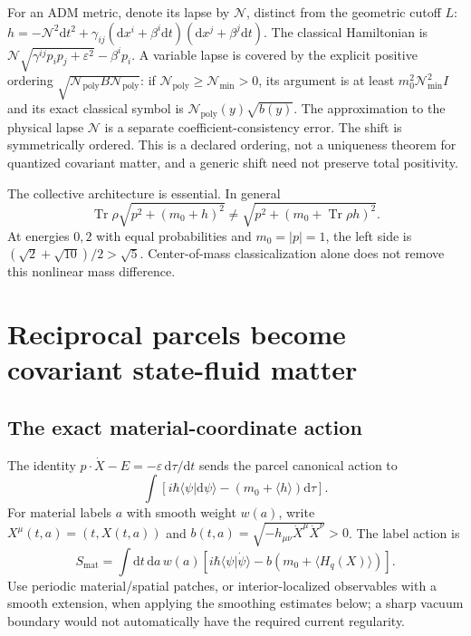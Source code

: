 \documentclass[11pt]{article}
\newcommand{\Tr}{\operatorname{Tr}}\newcommand{\dd}{\mathrm d}
\begin{document}
For an ADM metric, denote its lapse by $\mathcal N$, distinct from the geometric cutoff $L$:
$h=-\mathcal N^2\dd t^2+\gamma_{ij}(\dd x^i+\beta^i\dd t)(\dd x^j+\beta^j\dd t)$.
The classical Hamiltonian is
$\mathcal N\sqrt{\gamma^{ij}p_ip_j+\varepsilon^2}-\beta^ip_i$.
A variable lapse is covered by the explicit positive ordering
$\sqrt{\mathcal N_{\mathrm{poly}}B\mathcal N_{\mathrm{poly}}}$:
if $\mathcal N_{\mathrm{poly}}\ge\mathcal N_{\min}>0$, its argument is at least
$m_0^2\mathcal N_{\min}^2I$ and its exact classical symbol is
$\mathcal N_{\mathrm{poly}}(y)\sqrt{b(y)}$.
The approximation to the physical lapse $\mathcal N$ is a separate coefficient-consistency error.
The shift is symmetrically ordered. This is a declared ordering, not a uniqueness theorem for quantized covariant matter, and a generic shift need not preserve total positivity.

The collective architecture is essential. In general
\[
\Tr\rho\sqrt{p^2+(m_0+h)^2}
\ne\sqrt{p^2+(m_0+\Tr\rho h)^2}.
\]
At energies $0,2$ with equal probabilities and $m_0=|p|=1$, the left side is $(\sqrt2+\sqrt{10})/2>\sqrt5$. Center-of-mass classicalization alone does not remove this nonlinear mass difference.

\section{Reciprocal parcels become covariant state-fluid matter}
\subsection{The exact material-coordinate action}
The identity $p\cdot\dot X-E=-\varepsilon\,\dd\tau/\dd t$ sends the parcel canonical action to
\[
\int\left[i\hbar\langle\psi|\dd\psi\rangle
-(m_0+\langle h\rangle)\dd\tau\right].
\]
For material labels $a$ with smooth weight $w(a)$, write
$X^\mu(t,a)=(t,X(t,a))$ and
$b(t,a)=\sqrt{-h_{\mu\nu}\dot X^\mu\dot X^\nu}>0$.
The label action is
\begin{equation}\label{eq:labelaction}
S_{\mathrm{mat}}=\int\dd t\,\dd a\,w(a)
\left[i\hbar\langle\psi|\dot\psi\rangle
-b(m_0+\langle H_q(X)\rangle)\right].
\end{equation}
Use periodic material/spatial patches, or interior-localized observables with a smooth extension, when applying the smoothing estimates below; a sharp vacuum boundary would not automatically have the required current regularity.
\end{document}
